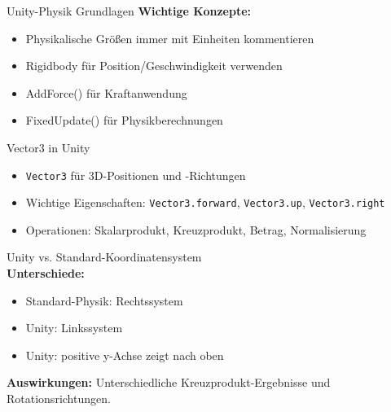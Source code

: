 \begin{concept}{Unity-Physik Grundlagen}
    \textbf{Wichtige Konzepte:}
    \begin{itemize}
        \item Physikalische Größen immer mit Einheiten kommentieren
        \item Rigidbody für Position/Geschwindigkeit verwenden
        \item AddForce() für Kraftanwendung
        \item FixedUpdate() für Physikberechnungen
    \end{itemize}
\end{concept}

\begin{definition}{Vector3 in Unity}
    \begin{itemize}
        \item \texttt{Vector3} für 3D-Positionen und -Richtungen
        \item Wichtige Eigenschaften: \texttt{Vector3.forward}, \texttt{Vector3.up}, \texttt{Vector3.right}
        \item Operationen: Skalarprodukt, Kreuzprodukt, Betrag, Normalisierung
    \end{itemize}
\end{definition}

\begin{example2}{Unity vs. Standard-Koordinatensystem}\\
    \textbf{Unterschiede:}
    \begin{itemize}
        \item Standard-Physik: Rechtssystem
        \item Unity: Linkssystem
        \item Unity: positive y-Achse zeigt nach oben
    \end{itemize}
    
    \textbf{Auswirkungen:} Unterschiedliche Kreuzprodukt-Ergebnisse und Rotationsrichtungen.
\end{example2}

\multend




